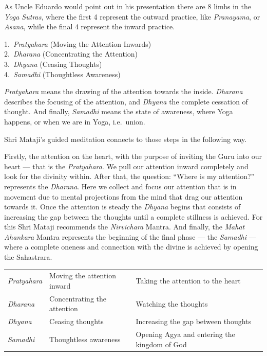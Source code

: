 \documentclass[12pt]{article}
\begin{document}
As Uncle Eduardo would point out in his presentation there are 8 limbs in the \textit{Yoga Sutras}, where the first 4 represent the outward practice, like \textit{Pranayama}, or \textit{Asana}, while the final 4 represent the inward practice.


1.\ \textit{Pratyahara} (Moving the Attention Inwards) \\
2.\ \textit{Dharana} (Concentrating the Attention) \\
3.\ \textit{Dhyana} (Ceasing Thoughts) \\
4.\ \textit{Samadhi} (Thoughtless Awareness)

\textit{Pratyahara} means the drawing of the attention towards the inside.
\textit{Dharana} describes the focusing of the attention, and \textit{Dhyana} the complete cessation of thought.
And finally, \textit{Samadhi} means the state of awareness, where Yoga happens, or when we are in Yoga, i.e.\ union.


Shri Mataji's guided meditation connects to those steps in the following way.

Firstly, the attention on the heart, with the purpose of inviting the Guru into our heart --- that is the \textit{Pratyahara}.
We pull our attention inward completely and look for the divinity within.
After that, the question: ``Where is my attention?'' represents the \textit{Dharana}.
Here we collect and focus our attention that is in movement due to mental projections from the mind that drag our attention towards it.
Once the attention is steady the \textit{Dhyana} begins that consists of increasing the gap between the thoughts until a complete stillness is achieved.
For this Shri Mataji recommends the \textit{Nirvichara} Mantra.
And finally, the \textit{Mahat Ahankara} Mantra represents the beginning of the final phase --- the \textit{Samadhi} --- where a complete oneness and connection with the divine is achieved by opening the Sahastrara.

\begin{tabular}{lll}
\textit{Pratyahara} & Moving the attention inward & Taking the attention to the heart            \\
\textit{Dharana}    & Concentrating the attention & Watching the thoughts                        \\
\textit{Dhyana}     & Ceasing thoughts            & Increasing the gap between thoughts          \\
\textit{Samadhi}    & Thoughtless awareness       & Opening Agya and entering the kingdom of God \\
\end{tabular}
\end{document}
